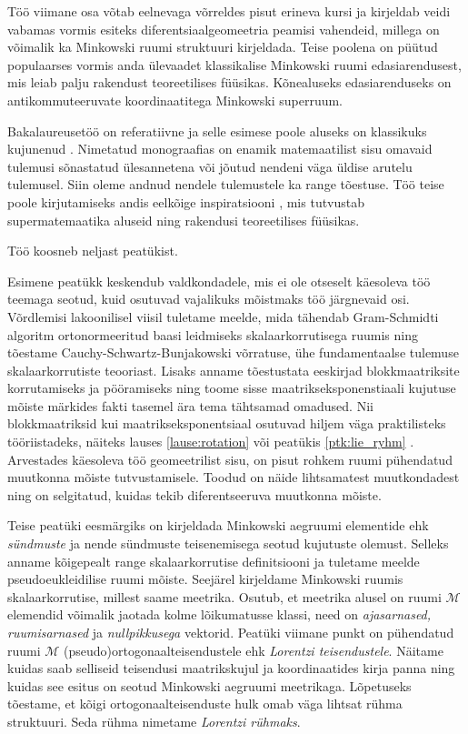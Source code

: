 \documentclass[12pt,a4paper,oneside]{article}
\theoremstyle{plain}
\theoremstyle{definition}
\numberwithin{equation}{section}
\def\M{{\mathcal M}}
\begin{document}
Töö viimane osa võtab eelnevaga võrreldes pisut erineva kursi 
ja kirjeldab veidi vabamas vormis esiteks diferentsiaalgeomeetria 
peamisi vahendeid, millega on võimalik ka Minkowski ruumi 
struktuuri kirjeldada. Teise poolena on püütud populaarses 
vormis anda ülevaadet klassikalise Minkowski ruumi 
edasiarendusest, mis leiab palju rakendust teoreetilises 
füüsikas. Kõnealuseks edasiarenduseks on antikommuteeruvate 
koordinaatitega Minkowski superruum.

Bakalaureusetöö on referatiivne ja selle esimese poole aluseks 
on klassikuks kujunenud \cite{Naber}. Nimetatud monograafias
on enamik matemaatilist sisu omavaid tulemusi sõnastatud 
ülesannetena või jõutud nendeni väga üldise arutelu tulemusel. 
Siin oleme andnud nendele tulemustele ka range tõestuse. Töö 
teise poole kirjutamiseks andis eelkõige inspiratsiooni 
\cite{Super}, mis tutvustab supermatemaatika aluseid ning 
rakendusi teoreetilises füüsikas.

Töö koosneb neljast peatükist.

Esimene peatükk keskendub valdkondadele, mis ei ole otseselt 
käesoleva töö teemaga seotud, kuid osutuvad vajalikuks 
mõistmaks töö järgnevaid osi. Võrdlemisi lakoonilisel 
viisil tuletame meelde, mida tähendab Gram-Schmidti algoritm 
ortonormeeritud baasi leidmiseks skalaarkorrutisega ruumis ning 
tõestame Cauchy-Schwartz-Bunjakowski võrratuse, ühe 
fundamentaalse tulemuse skalaarkorrutiste teooriast. Lisaks 
anname tõestustata eeskirjad blokkmaatriksite korrutamiseks 
ja pööramiseks ning toome sisse maatrikseksponenstiaali kujutuse 
mõiste märkides fakti tasemel ära tema tähtsamad omadused. 
Nii blokkmaatriksid kui maatrikseksponentsiaal osutuvad hiljem 
väga praktilisteks tööriistadeks, näiteks lauses 
\ref{lause:rotation} või peatükis \ref{ptk:lie_ryhm} 
. Arvestades käesoleva 
töö geomeetrilist sisu, on pisut rohkem ruumi pühendatud 
muutkonna mõiste tutvustamisele. Toodud on näide lihtsamatest 
muutkondadest ning on selgitatud, kuidas tekib diferentseeruva 
muutkonna mõiste.

Teise peatüki eesmärgiks on kirjeldada Minkowski aegruumi 
elementide ehk \emph{sündmuste} ja nende sündmuste teisenemisega 
seotud kujutuste olemust. Selleks anname kõigepealt range 
skalaarkorrutise definitsiooni ja tuletame meelde 
pseudoeukleidilise ruumi mõiste. Seejärel kirjeldame 
Minkowski ruumis skalaarkorrutise, millest saame meetrika. 
Osutub, et meetrika alusel on ruumi $\M$ elemendid võimalik 
jaotada kolme lõikumatusse klassi, need on \emph{ajasarnased, 
ruumisarnased} ja \emph{nullpikkusega} vektorid. 
Peatüki viimane punkt on pühendatud ruumi $\M$ 
(pseudo)ortogonaalteisendustele ehk \emph{Lorentzi 
teisendustele}. Näitame kuidas saab selliseid 
teisendusi maatrikskujul ja koordinaatides kirja panna ning 
kuidas see esitus on seotud Minkowski aegruumi meetrikaga. 
Lõpetuseks tõestame, et kõigi ortogonaalteisenduste hulk 
omab väga lihtsat rühma struktuuri. Seda rühma nimetame 
\emph{Lorentzi rühmaks}.
\end{document}
